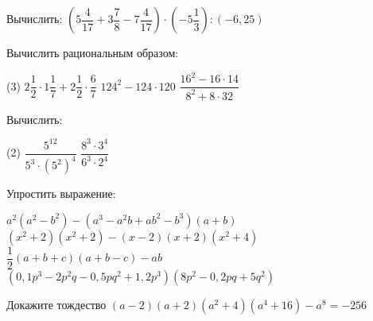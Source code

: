 \begin{homework}[number=2]
	\begin{listofex}
	\item Вычислить: \( \left( 5\dfrac{4}{17}+3\dfrac{7}{8}-7\dfrac{4}{17} \right)\cdot\left( -5\dfrac{1}{3} \right):(-6,25) \)
	\item Вычислить рациональным образом:
	\begin{tasks}(3)
		\task \( 2\dfrac{1}{2}\cdot1\dfrac{1}{7}+2\dfrac{1}{2}\cdot\dfrac{6}{7} \)
		\task \( 124^2-124\cdot120 \)
		\task \( \dfrac{16^2-16\cdot14}{8^2+8\cdot32} \)
	\end{tasks}
	\item Вычислить:
	\begin{tasks}(2)
		\task \( \dfrac{5^{12}}{5^3\cdot(5^2)^4} \)
		\task \( \dfrac{8^3\cdot3^4}{6^3\cdot2^4} \)
	\end{tasks}
	\item Упростить выражение:
	\begin{tasks} 
		\task \( a^2(a^2-b^2)-(a^3-a^2b+ab^2-b^3)(a+b) \)
		\task \( (x^2+2)(x^2+2)-(x-2)(x+2)(x^2+4) \)
		\task \( \dfrac{1}{2}(a+b+c)(a+b-c)-ab \)
		\task \( (0,1p^3-2p^2q-0,5pq^2+1,2p^3)(8p^2-0,2pq+5q^2) \)
	\end{tasks}
	\item Докажите тождество \( (a-2)(a+2)(a^2+4)(a^4+16)-a^8=-256 \)
	\end{listofex}
\end{homework}

